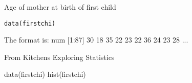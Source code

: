 \begin{Description}\relax
Age of mother at birth of first child
\end{Description}
\begin{Usage}
\begin{verbatim}data(firstchi)\end{verbatim}
\end{Usage}
\begin{Format}\relax
The format is:
num [1:87] 30 18 35 22 23 22 36 24 23 28 ...
\end{Format}
\begin{Source}\relax
From Kitchens Exploring Statistics
\end{Source}
\begin{Examples}
\begin{ExampleCode}
data(firstchi)
hist(firstchi)
\end{ExampleCode}
\end{Examples}

